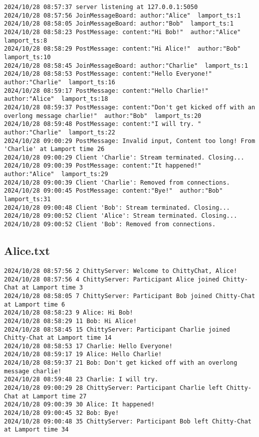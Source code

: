 \documentclass[a4paper,11pt]{article}
\begin{document}
\begin{lstlisting}
2024/10/28 08:57:37 server listening at 127.0.0.1:5050
2024/10/28 08:57:56 JoinMessageBoard: author:"Alice"  lamport_ts:1
2024/10/28 08:58:05 JoinMessageBoard: author:"Bob"  lamport_ts:1
2024/10/28 08:58:23 PostMessage: content:"Hi Bob!"  author:"Alice"  lamport_ts:8
2024/10/28 08:58:29 PostMessage: content:"Hi Alice!"  author:"Bob"  lamport_ts:10
2024/10/28 08:58:45 JoinMessageBoard: author:"Charlie"  lamport_ts:1
2024/10/28 08:58:53 PostMessage: content:"Hello Everyone!"  author:"Charlie"  lamport_ts:16
2024/10/28 08:59:17 PostMessage: content:"Hello Charlie!"  author:"Alice"  lamport_ts:18
2024/10/28 08:59:37 PostMessage: content:"Don't get kicked off with an overlong message charlie!"  author:"Bob"  lamport_ts:20
2024/10/28 08:59:48 PostMessage: content:"I will try. "  author:"Charlie"  lamport_ts:22
2024/10/28 09:00:29 PostMessage: Invalid input, Content too long! From 'Charlie' at Lamport time 26
2024/10/28 09:00:29 Client 'Charlie': Stream terminated. Closing...
2024/10/28 09:00:39 PostMessage: content:"It happened!"  author:"Alice"  lamport_ts:29
2024/10/28 09:00:39 Client 'Charlie': Removed from connections.
2024/10/28 09:00:45 PostMessage: content:"Bye!"  author:"Bob"  lamport_ts:31
2024/10/28 09:00:48 Client 'Bob': Stream terminated. Closing...
2024/10/28 09:00:52 Client 'Alice': Stream terminated. Closing...
2024/10/28 09:00:52 Client 'Bob': Removed from connections.
\end{lstlisting}

\pagebreak

\subsection{Alice.txt}

\begin{lstlisting}
2024/10/28 08:57:56 2 ChittyServer: Welcome to ChittyChat, Alice!
2024/10/28 08:57:56 4 ChittyServer: Participant Alice joined Chitty-Chat at Lamport time 3
2024/10/28 08:58:05 7 ChittyServer: Participant Bob joined Chitty-Chat at Lamport time 6
2024/10/28 08:58:23 9 Alice: Hi Bob!
2024/10/28 08:58:29 11 Bob: Hi Alice!
2024/10/28 08:58:45 15 ChittyServer: Participant Charlie joined Chitty-Chat at Lamport time 14
2024/10/28 08:58:53 17 Charlie: Hello Everyone!
2024/10/28 08:59:17 19 Alice: Hello Charlie!
2024/10/28 08:59:37 21 Bob: Don't get kicked off with an overlong message charlie!
2024/10/28 08:59:48 23 Charlie: I will try. 
2024/10/28 09:00:29 28 ChittyServer: Participant Charlie left Chitty-Chat at Lamport time 27
2024/10/28 09:00:39 30 Alice: It happened!
2024/10/28 09:00:45 32 Bob: Bye!
2024/10/28 09:00:48 35 ChittyServer: Participant Bob left Chitty-Chat at Lamport time 34
\end{lstlisting}
\end{document}
